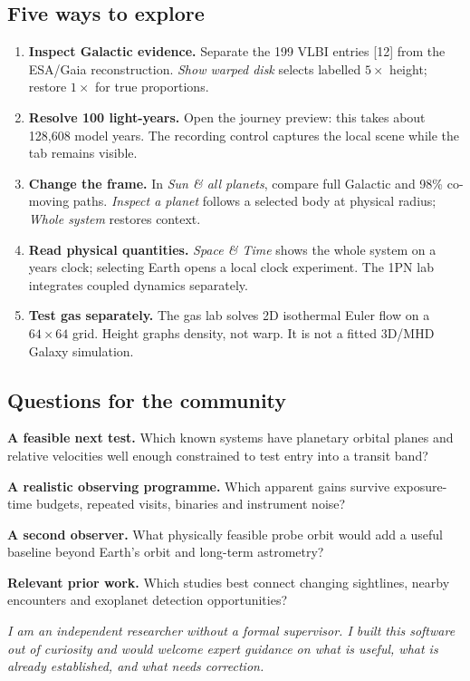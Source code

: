 \begin{minipage}[t]{.485\linewidth}\vspace{0pt}\setlength{\parskip}{3pt}
\subsection*{Five ways to explore}
\begin{enumerate}[leftmargin=1.4em,itemsep=5pt]
\item \textbf{Inspect Galactic evidence.} Separate the 199 VLBI entries [12] from the ESA/Gaia reconstruction. \emph{Show warped disk} selects labelled $5\times$ height; restore $1\times$ for true proportions.
\item \textbf{Resolve 100 light-years.} Open the journey preview: this takes about 128,608 model years. The recording control captures the local scene while the tab remains visible.
\item \textbf{Change the frame.} In \emph{Sun \& all planets}, compare full Galactic and 98\% co-moving paths. \emph{Inspect a planet} follows a selected body at physical radius; \emph{Whole system} restores context.
\item \textbf{Read physical quantities.} \emph{Space \& Time} shows the whole system on a years clock; selecting Earth opens a local clock experiment. The 1PN lab integrates coupled dynamics separately.
\item \textbf{Test gas separately.} The gas lab solves 2D isothermal Euler flow on a $64\times64$ grid. Height graphs density, not warp. It is not a fitted 3D/MHD Galaxy simulation.
\end{enumerate}
\end{minipage}\hfill
\begin{minipage}[t]{.485\linewidth}\vspace{0pt}\setlength{\parskip}{3pt}
\subsection*{Questions for the community}
\textbf{A feasible next test.} Which known systems have planetary orbital planes and relative velocities well enough constrained to test entry into a transit band?

\textbf{A realistic observing programme.} Which apparent gains survive exposure-time budgets, repeated visits, binaries and instrument noise?

\textbf{A second observer.} What physically feasible probe orbit would add a useful baseline beyond Earth's orbit and long-term astrometry?

\textbf{Relevant prior work.} Which studies best connect changing sightlines, nearby encounters and exoplanet detection opportunities?

\textit{I am an independent researcher without a formal supervisor. I built this software out of curiosity and would welcome expert guidance on what is useful, what is already established, and what needs correction.}
\end{minipage}
\vspace{7pt}
